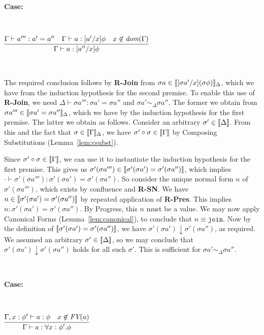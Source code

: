 \documentclass[copyright]{eptcs}
\newcommand{\join}[0]{\texttt{join}}
\newcommand{\interp}[1]{[\negthinspace[#1]\negthinspace]}
\begin{document}
\ 

\noindent \textbf{Case:}

\

$\infer{\Gamma\vdash a:[a''/x]\phi}{\Gamma \vdash a''': a' = a'' & \Gamma \vdash a:[a'/x]\phi & x\not\in\textit{dom}(\Gamma)}$

\ 

\noindent The required conclusion follows by \textbf{R-Join} from
$\sigma a\in\interp{[\sigma a'/x](\sigma\phi)}_\Delta$, which we have
from the induction hypothesis for the second premise.  To enable this
use of \textbf{R-Join}, we need $\Delta\vdash \sigma a''':\sigma a' =
\sigma a''$ and $\sigma a'\sim_\Delta \sigma a''$.  The former we
obtain from $\sigma a'''\in\interp{\sigma a' = \sigma a''}_\Delta$,
which we have by the induction hypothesis for the first premise.  The
latter we obtain as follows.  Consider an arbitrary
$\sigma'\in\interp{\Delta}$.  From this and the fact that
$\sigma\in\interp{\Gamma}_\Delta$, we have
$\sigma'\circ\sigma\in\interp{\Gamma}$ by Composing Substitutions
(Lemma~\ref{lem:csubst}).  

Since $\sigma'\circ\sigma\in\interp{\Gamma}$, we can use it to
instantiate the induction hypothesis for the first premise.  This
gives us $\sigma' (\sigma a''')\in\interp{\sigma'(\sigma a') =
  \sigma'(\sigma a'')}$, which implies $\cdot\vdash\sigma'(\sigma
a'''):\sigma'(\sigma a') = \sigma'(\sigma a'')$.  So consider the
unique normal form $n$ of $\sigma' (\sigma a''')$, which exists by
confluence and \textbf{R-SN}.  We have $n\in\interp{\sigma'(\sigma a')
  = \sigma'(\sigma a'')}$ by repeated application of \textbf{R-Pres}.
This implies $n:\sigma'(\sigma a') = \sigma'(\sigma a'')$.  By
Progress, this $n$ must be a value.  We may now apply Canonical Forms
(Lemma~\ref{lem:canonical}), to conclude that $n \equiv \join$.  Now
by the definition of $\interp{\sigma'(\sigma a') = \sigma'(\sigma
  a'')}$, we have $\sigma'(\sigma a') \downarrow \sigma'(\sigma a'')$,
as required.  We assumed an arbitrary $\sigma'\in\interp{\Delta}$, so
we may conclude that $\sigma'(\sigma a') \downarrow \sigma'(\sigma
a'')$ holds for all such $\sigma'$.  This is sufficient for $\sigma a'
\sim_\Delta \sigma a''$.

\ 

\noindent \textbf{Case:}

\

$\infer{\Gamma \vdash a : \forall x:\phi'.\phi}
       {\Gamma, x:\phi' \vdash a:\phi & x\not\in\textit{FV}(a)}$

\ 
\end{document}
